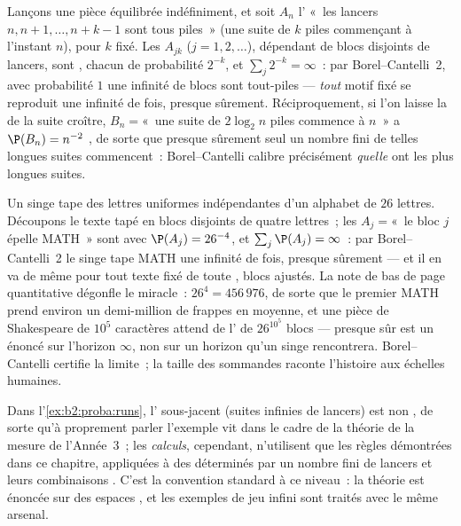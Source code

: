 \begin{example}\label{ex:b2:proba:runs}
Lançons une pièce équilibrée indéfiniment, et soit $A_n$ l' «~les lancers $n,
n+1, \dots, n + k - 1$ sont tous piles~» (une suite de $k$ piles
commençant à l'instant $n$), pour $k$ fixé. Les  $A_{jk}$ ($j =
1, 2, \dots$), dépendant de blocs disjoints de lancers, sont
, chacun de probabilité $2^{-k}$, et $\sum_j 2^{-k} =
\infty$~: par Borel--Cantelli~2, avec probabilité $1$ une infinité
de blocs sont tout-piles --- \emph{tout} motif fixé se reproduit
une infinité de fois, presque sûrement. Réciproquement, si l'on laisse la 
de la suite croître, $B_n = {}$«~une suite de $2\log_2 n$ piles commence à
$n$~» a $\P(B_n) = n^{-2}$ , de sorte que presque sûrement seul un
nombre fini de telles longues suites commencent~: Borel--Cantelli calibre
précisément \emph{quelle } ont les plus longues suites.
\end{example}

\begin{example}
Un singe tape des lettres uniformes indépendantes d'un
alphabet de $26$ lettres. Découpons le texte tapé en blocs disjoints
de quatre lettres~; les  $A_j = {}$«~le bloc $j$ épelle
MATH~» sont  avec $\P(A_j) = 26^{-4}$, et
$\sum_j\P(A_j) = \infty$~: par Borel--Cantelli~2 le singe
tape MATH une infinité de fois, presque sûrement --- et il en va de même
pour tout texte fixé de toute , blocs ajustés.
La note de bas de page quantitative dégonfle le miracle~: $26^4 =
456\,976$, de sorte que le premier MATH prend environ un demi-million
de frappes en moyenne, et une pièce de Shakespeare de $10^5$
caractères attend de l' de $26^{10^5}$ blocs --- presque sûr
est un énoncé sur l'horizon $\infty$, non sur un
horizon qu'un singe rencontrera. Borel--Cantelli certifie la
limite~; la taille des sommandes raconte l'histoire aux échelles humaines.
\end{example}

\begin{remark}
Dans l'\cref{ex:b2:proba:runs}, l' sous-jacent (suites infinies
de lancers) est non , de sorte qu'à proprement parler
l'exemple vit dans le cadre de la théorie de la mesure de l'Année~3~; les
\emph{calculs}, cependant, n'utilisent que les règles démontrées dans ce
chapitre, appliquées à des  déterminés par un nombre fini de lancers et
leurs combinaisons . C'est la convention standard à ce niveau~:
la théorie est énoncée sur des espaces , et les exemples de
jeu infini sont traités avec le même arsenal.
\end{remark}

